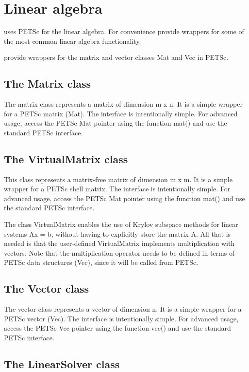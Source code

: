 \chapter{Linear algebra}

\dolfin{} uses PETSc for the linear algebra. For convenience \dolfin{} provide 
wrappers for some of the most common linear algebra functionality.   


\dolfin{} provide wrappers for the matrix and vector classes Mat and Vec in 
PETSc.  

\section{The Matrix class}

The matrix class represents a matrix of dimension m x n. It is a
simple wrapper for a PETSc matrix (Mat). The interface is
intentionally simple. For advanced usage, access the PETSc Mat
pointer using the function mat() and use the standard PETSc
interface.

\section{The VirtualMatrix class}

This class represents a matrix-free matrix of dimension m x m.
It is a simple wrapper for a PETSc shell matrix. The interface
is intentionally simple. For advanced usage, access the PETSc
Mat pointer using the function mat() and use the standard PETSc
interface.

The class VirtualMatrix enables the use of Krylov subspace
methods for linear systems Ax = b, without having to explicitly
store the matrix A. All that is needed is that the user-defined
VirtualMatrix implements multiplication with vectors. Note that
the multiplication operator needs to be defined in terms of
PETSc data structures (Vec), since it will be called from PETSc.


\section{The Vector class}

The vector class represents a vector of dimension n. It is a
simple wrapper for a PETSc vector (Vec). The interface is
intentionally simple. For advanced usage, access the PETSc Vec
pointer using the function vec() and use the standard PETSc
interface.

\section{The LinearSolver class}

